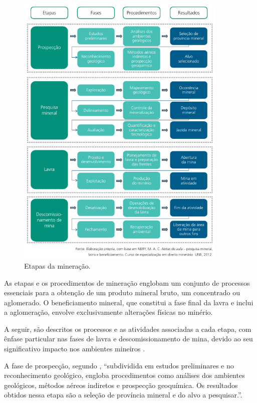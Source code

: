 \begin{figure}[!htb]
    \centering
    \includegraphics[width=0.9\textwidth]{figures/image14_etapas_mineracao.png}
    \caption{Etapas da mineração.}
    \label{fig:etapas_mineracao}
\end{figure}

As etapas e os procedimentos de mineração englobam um conjunto de
processos essenciais para a obtenção de um produto mineral bruto, um
concentrado ou aglomerado. O beneficiamento mineral, que constitui a
fase final da lavra e inclui a aglomeração, envolve exclusivamente
alterações físicas no minério.

A seguir, são descritos os processos e as atividades associadas a cada
etapa, com ênfase particular nas fases de lavra e descomissionamento de
mina, devido ao seu significativo impacto nos ambientes mineiros \cite[p.342]{carvalho2018sustentabilidade}.

A fase de prospecção, segundo \cite[p.342]{carvalho2018sustentabilidade},
``subdividida em estudos preliminares e no reconhecimento geológico,
engloba procedimentos como análises dos ambientes geológicos, métodos
aéreos indiretos e prospecção geoquímica. Os resultados obtidos nessa
etapa são a seleção de província mineral e do alvo a pesquisar.''.

